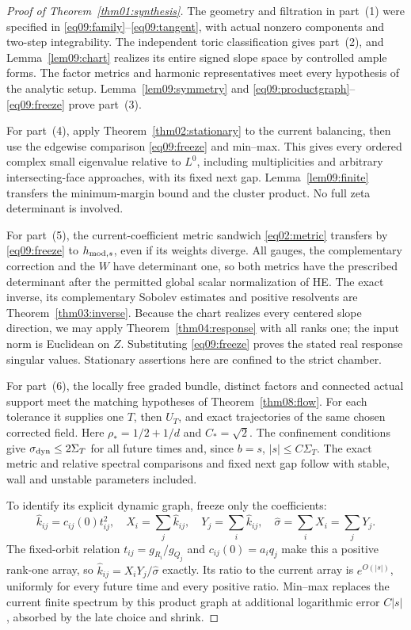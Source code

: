 \documentclass[11pt]{amsart}
\theoremstyle{definition}
\theoremstyle{remark}
\begin{document}
\begin{proof}[Proof of Theorem~\ref{thm01:synthesis}]
The geometry and filtration in part~(1) were specified in
\eqref{eq09:family}--\eqref{eq09:tangent}, with actual nonzero
components and two-step integrability. The independent toric
classification gives part~(2), and Lemma~\ref{lem09:chart} realizes
its entire signed slope space by controlled ample forms. The
factor metrics and harmonic representatives meet every hypothesis
of the analytic setup. Lemma~\ref{lem09:symmetry} and
\eqref{eq09:productgraph}--\eqref{eq09:freeze} prove part~(3).

For part~(4), apply Theorem~\ref{thm02:stationary} to the current
balancing, then use the edgewise comparison \eqref{eq09:freeze}
and min--max. This gives every ordered complex small eigenvalue
relative to \(L^0\), including multiplicities and arbitrary
intersecting-face approaches, with its fixed next gap.
Lemma~\ref{lem09:finite} transfers the minimum-margin bound and
the cluster product. No full zeta determinant is involved.

For part~(5), the current-coefficient metric sandwich
\eqref{eq02:metric} transfers by \eqref{eq09:freeze} to
\(h_{{\rm mod},s}\), even if its weights diverge.
All gauges, the complementary correction and the \(W\) have
determinant one, so both metrics have the prescribed determinant
after the permitted global scalar normalization of HE.
The exact inverse, its complementary Sobolev estimates and positive
resolvents are Theorem~\ref{thm03:inverse}. Because the chart realizes every centered slope direction, we may
apply Theorem~\ref{thm04:response} with all
ranks one; the input norm is Euclidean on \(Z\). Substituting
\eqref{eq09:freeze} proves the stated real response singular values.
Stationary assertions here are confined to the strict chamber.

For part~(6), the locally free graded bundle, distinct factors and
connected actual support meet the matching hypotheses of
Theorem~\ref{thm08:flow}. For each tolerance it supplies one
\(T\), then \(U_T\), and exact trajectories of the same chosen
corrected field. Here \(\rho_*=1/2+1/d\) and \(C_*=\sqrt2\).
The confinement conditions give \(\sigma_{\rm dyn}\le2\Sigma_T\)
for all future times and, since \(b=s\), \(|s|\le C\Sigma_T\).
The exact metric and relative spectral comparisons and fixed next
gap follow with stable, wall and unstable parameters included.

To identify its explicit dynamic graph, freeze only the coefficients:
\begin{equation}\label{eq09:dynamic}
 \widehat k_{ij}=c_{ij}(0)t_{ij}^2,
 \quad X_i=\sum_j\widehat k_{ij},\quad Y_j=\sum_i\widehat k_{ij},
 \quad\widehat\sigma=\sum_iX_i=\sum_jY_j.
\end{equation}
The fixed-orbit relation \(t_{ij}=g_{R_i}/g_{Q_j}\) and
\(c_{ij}(0)=a_iq_j\) make this a positive rank-one array, so
\(\widehat k_{ij}=X_iY_j/\widehat\sigma\) exactly.
Its ratio to the current array is \(e^{O(|s|)}\), uniformly for
every future time and every positive ratio. Min--max replaces
the current finite spectrum by this product graph at additional
logarithmic error \(C|s|\), absorbed by the late choice and shrink.


\end{proof}
\end{document}
